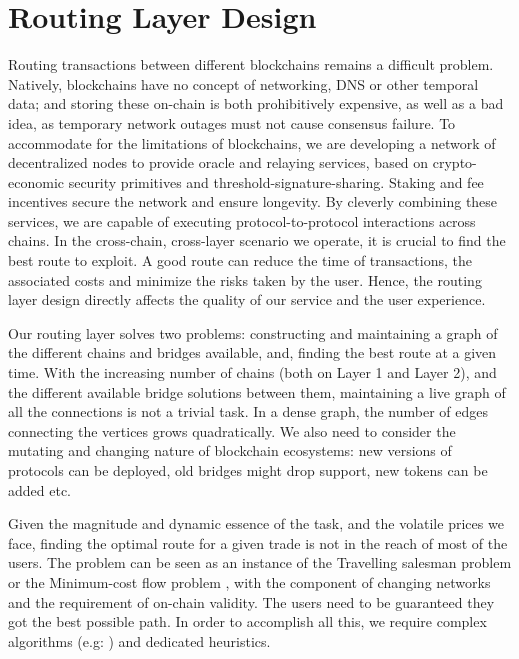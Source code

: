 \section{Routing Layer Design}
Routing transactions between different blockchains remains a difficult problem. Natively, blockchains have no concept of networking, DNS or other temporal data; and storing these on-chain is both prohibitively expensive, as well as a bad idea, as temporary network outages must not cause consensus failure. To accommodate for the limitations of blockchains, we are developing a network of decentralized nodes to provide oracle and relaying services, based on crypto-economic security primitives and threshold-signature-sharing. Staking and fee incentives secure the network and ensure longevity. By cleverly combining these services, we are capable of executing protocol-to-protocol interactions across chains. In the cross-chain, cross-layer scenario we operate, it is crucial to find the best route to exploit. A good route can reduce the time of transactions, the associated costs and minimize the risks taken by the user. Hence, the routing layer design directly affects the quality of our service and the user experience. 

Our routing layer solves two problems: constructing and maintaining a graph of the different chains and bridges available, and, finding the best route at a given time. With the increasing number of chains (both on Layer 1 and Layer 2), and the different available bridge solutions between them, maintaining a live graph of all the connections is not a trivial task. In a dense graph, the number of edges connecting the vertices grows quadratically. We also need to consider the mutating and changing nature of blockchain ecosystems: new versions of protocols can be deployed, old bridges might drop support, new tokens can be added etc. 

Given the magnitude and dynamic essence of the task, and the volatile prices we face, finding the optimal route for a given trade is not in the reach of most of the users. The problem can be seen as an instance of the Travelling salesman problem \cite{Gavish1978TheProblems} or the Minimum-cost flow problem \cite{Orlin1988AAlgorithm}, with the component of changing networks and the requirement of on-chain validity. The users need to be guaranteed they got the best possible path. In order to accomplish all this, we require complex algorithms (e.g: \cite{Feigenbaum2005ARouting}) and dedicated heuristics.

